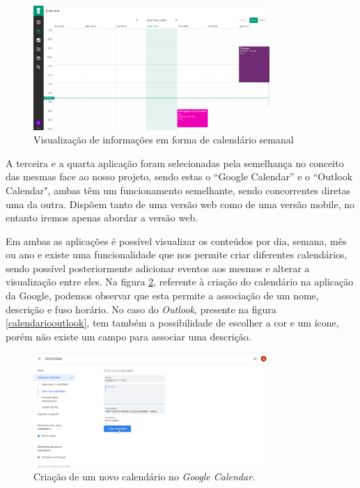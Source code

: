 \documentclass[11pt, twoside]{report}
\begin{document}
\begin{figure}[H] 
	\centering 
	\includegraphics[width=0.8\textwidth,height=0.8\textheight,keepaspectratio]{image/estadodearte/calendariostudy}
	\caption{Visualização de informações em forma de calendário semanal}
	\label{calendariostudylife}
\end{figure}

	A terceira e a quarta aplicação foram selecionadas pela semelhança no conceito das mesmas face ao nosso projeto, sendo estas o ``Google Calendar'' e o ``Outlook Calendar", ambas têm um funcionamento semelhante, sendo concorrentes diretas uma da outra.
	Dispõem tanto de uma versão web como de uma versão mobile, no entanto iremos apenas abordar a versão web.

	Em ambas as aplicações é possível visualizar os conteúdos por dia, semana, mês ou ano e existe uma funcionalidade que nos permite criar diferentes calendários, sendo possível posteriormente adicionar eventos aos mesmos e alterar a visualização entre eles.
	Na figura \ref{googlecalendar}, referente à criação do calendário na aplicação da Google, podemos observar que esta permite a associação de um nome, descrição e fuso horário.
	No caso do \textit{Outlook}, presente na figura \ref{calendariooutlook}, tem também a possibilidade de escolher a cor e um ícone, porém não existe um campo para associar uma descrição.

	\begin{figure}[H] 
		\centering
		\includegraphics[width=0.8\textwidth,height=0.8\textheight,keepaspectratio]{image/estadodearte/criacao_calendario_google}
		\caption{Criação de um novo calendário no \textit{Google Calendar}.}
		\label{googlecalendar}
	\end{figure}
\end{document}

